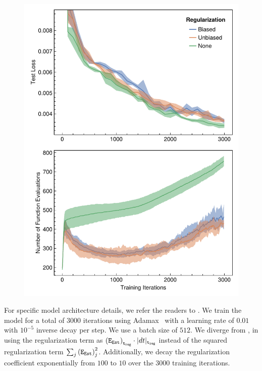 \begin{figure}
  \centering
  \vspace{-2em}
  \includegraphics[width=\linewidth]{../figures/local_regularizing_neural_des/physionet.pdf}
  \label{fig:physionet_localreg}
  \vspace{-2em}
\end{figure}

For specific model architecture details, we refer the readers to \citet{pal2021opening}. We train the model for a total of $3000$ iterations using Adamax~\citep{kingma2017adam} with a learning rate of $0.01$ with $10^{-5}$ inverse decay per step. We use a batch size of $512$. We diverge from \citet{pal2021opening}, in using the regularization term as $\left(\texttt{E}_{\texttt{Est}}\right)_{\texttt{t}_{\texttt{reg}}} \cdot |dt|_{\texttt{t}_{\texttt{reg}}}$ instead of the squared regularization term $\sum_j \left(\texttt{E}_{\texttt{Est}}\right)_j^2$. Additionally, we decay the regularization coefficient exponentially from $100$ to $10$ over the $3000$ training iterations.

